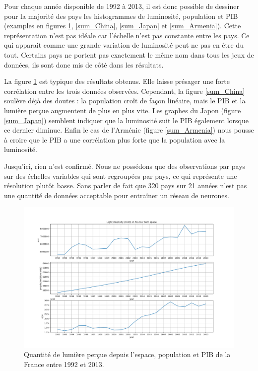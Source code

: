 \documentclass[a4paper, 11pt]{report}
\begin{document}
Pour chaque année disponible de 1992 à 2013, il est donc possible de dessiner pour la majorité des pays les histogrammes de luminosité, population et PIB (examples en figures \ref{sum_France}, \ref{sum_China}, \ref{sum_Japan} et \ref{sum_Armenia}). Cette représentation n'est pas idéale car l'échelle n'est pas constante entre les pays. Ce qui apparait comme une grande variation de luminosité peut ne pas en être du tout. Certains pays ne portent pas exactement le même nom dans tous les jeux de données, ils sont donc mis de côté dans les résultats.

La figure \ref{sum_France} est typique des résultats obtenus. Elle laisse présager une forte corrélation entre les trois données observées. Cependant, la figure \ref{sum_China} soulève déjà des doutes : la population croît de façon linéaire, mais le PIB et la lumière perçue augmentent de plus en plus vite. Les graphes du Japon (figure \ref{sum_Japan}) semblent indiquer que la luminosité suit le PIB également lorsque ce dernier diminue. Enfin le cas de l'Arménie (figure \ref{sum_Armenia}) nous pousse à croire que le PIB a une corrélation plus forte que la population avec la luminosité.

Jusqu'ici, rien n'est confirmé. Nous ne possédons que des observations par pays sur des échelles variables qui sont regroupées par pays, ce qui représente une résolution plutôt basse. Sans parler de fait que 320 pays sur 21 années n'est pas une quantité de données acceptable pour entraîner un réseau de neurones.

\begin{figure}
	\centering
	\includegraphics[width=1.0\textwidth]{img/sum_France.png}
	\caption{Quantité de lumière perçue depuis l'espace, population et PIB de la France entre 1992 et 2013.}
	\label{sum_France}
\end{figure}
\end{document}
